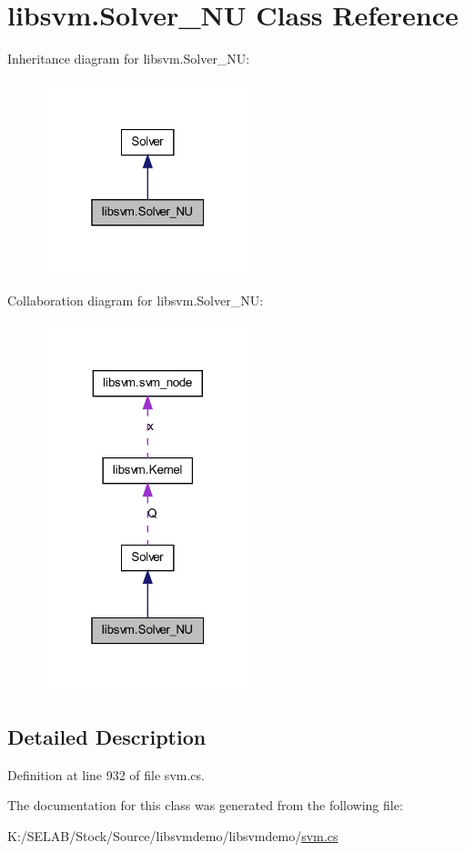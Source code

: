 \hypertarget{classlibsvm_1_1_solver___n_u}{
\section{libsvm.Solver\_\-NU Class Reference}
\label{classlibsvm_1_1_solver___n_u}
}


Inheritance diagram for libsvm.Solver\_\-NU:
\nopagebreak
\begin{figure}[H]
\begin{center}
\leavevmode
\includegraphics[width=172pt]{classlibsvm_1_1_solver___n_u__inherit__graph}
\end{center}
\end{figure}


Collaboration diagram for libsvm.Solver\_\-NU:
\nopagebreak
\begin{figure}[H]
\begin{center}
\leavevmode
\includegraphics[width=172pt]{classlibsvm_1_1_solver___n_u__coll__graph}
\end{center}
\end{figure}


\subsection{Detailed Description}


Definition at line 932 of file svm.cs.



The documentation for this class was generated from the following file:\begin{DoxyCompactItemize}
\item 
K:/SELAB/Stock/Source/libsvmdemo/libsvmdemo/\hyperlink{svm_8cs}{svm.cs}\end{DoxyCompactItemize}
